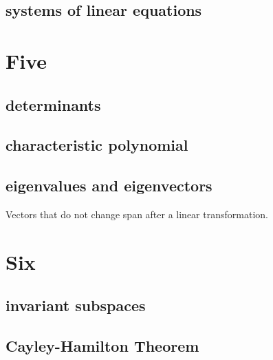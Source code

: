 \documentclass[11pt]{article}
\begin{document}
\subsection{systems of linear equations}

\newpage

\section{Five}
\subsection{determinants}
\subsection{characteristic polynomial}
\subsection{eigenvalues and eigenvectors}
Vectors that do not change span after a linear transformation.

\newpage

\section{Six}
\subsection{invariant subspaces}
\subsection{Cayley-Hamilton Theorem}
\end{document}
